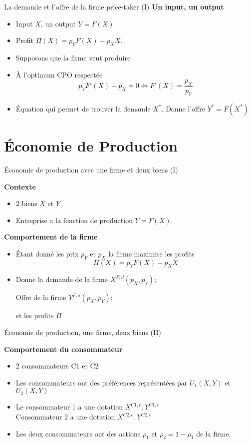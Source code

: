 \documentclass[handout]{beamer}
\newenvironment{iPar}[1]{\textbf{#1} \begin{itemize}}{\end{itemize}}
\newcommand{\mdp}{\medskip \pause}
\begin{document}
\begin{frame}{La demande et l'offre de la firme price-taker (I)}
\begin{iPar}{Un input, un output} \item  Input $X$, un output $Y =
F(X)$  \item Profit $\Pi(X) = p_Y F(X) -
p_XX$.  \item  Supposons que la firme veut produire  \item À l'optimum CPO respectée $$ p_Y F'(X) - p_X = 0 \iff F'(X) =
\frac{p_X}{p_Y}$$ \item Équation qui permet de trouver la demande $X^*$.
Donne l'offre $Y^* = F(X^*)$ \end{iPar}
\end{frame}

\section{Économie de Production}

\begin{frame}{Économie de production avec une firme et deux biens (I)}

\begin{iPar}{Contexte} \item 2 biens $X$ et $Y$  \item Entreprise a la fonction de production $Y = F(X)$.\end{iPar}\mdp

\begin{iPar}{Comportement de la firme}\item Étant donné les prix $p_Y$ et $p_X$ la firme
maximise les profits $$\Pi(X) = p_Y F(X) - p_X X$$   \item Donne la demande de la firme $X^{F,d}(p_X,p_Y)$; \smallskip

Offre de la firme
$Y^{F,s}(p_X,p_Y)$;\smallskip

 et les profits $\Pi$ \end{iPar} 
 
\end{frame}

\begin{frame}{Économie de production, une firme, deux biens (II)}

\begin{iPar}{Comportement du consommateur} \item 2 consommateurs C1 et C2
 \item Les consommateurs ont des préférences représentées par
$U_1(X, Y)$ et $U_2(X,Y)$ \item Le consommateur  1 a une {dotation} $X^{C1,e},
Y^{C1,e}$ \\ \medskip Consommateur 2 a une {dotation} $X^{C2,e}, Y^{C2,e}$
\item Les deux consommateurs ont des actions $\rho_{1}$ et $\rho_2 = 1- \rho_1$
de la firme.
\end{iPar}
\end{frame}
\end{document}
